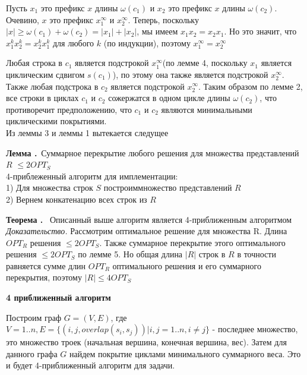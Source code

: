 \documentclass[11pt,a4paper]{article}
\newcommand\ifnonempty[2]{\ifthenelse{\equal{#1}{}}{}{#2}}
\newcounter{thm}
\newcounter{lem}
\newcommand{\thm}[1][]{\smallskip\par\hangafter=1\normalsize\textbf{Теорема \refstepcounter{thm}\thethm\ifnonempty{#1}{ (#1)}.}~}
\newcommand{\lem}[1][]{\smallskip\par\hangafter=1\normalsize\textbf{Лемма \refstepcounter{lem}\thelem\ifnonempty{#1}{ (#1)}.}~}
\begin{document}
Пусть $x_1$ это префикс $x$ длины $\omega(c_1)$ и $x_2$ это префикс $x$ длины $\omega(c_2)$. Очевино, $x$ это префикс $x_1^\infty$ и $x_2^\infty.$
Теперь, поскольку $|x| \ge \omega(c_1) + \omega(c_2) = |x_1| + |x_2|$, мы имеем $x_1 x_2 = x_2 x_1$. Но это значит, что $x_1^k x_2^k = x_2^k x_1^k$
для любого $k$ (по индукции), поэтому $x_1^\infty = x_2^\infty$
\par
Любая строка в $c_1$ является подстрокой $x_1^\infty$(по лемме 4, поскольку $x_1$ является циклическим сдвигом $s(c_1)$), по этому она также является
подстрокой $x_2^\infty$. Также любая подстрока в $c_2$ является подстрокой $x_2^\infty$. Таким образом по лемме 2, все строки в циклах $c_1$ и $c_2$
сожержатся в одном цикле длины $\omega(c_2)$, что противоречит предположению, что $c_1$ и $c_2$ являются минимальными циклическими покрытиями.
\\
Из леммы 3 и леммы 1 вытекается следущее

\lem Суммарное перекрытие любого решения для множества представлений $R$ $\le 2OPT_S$\\

4-приблеженный алгоритм для имплементации:\\
1) Для множества строк $S$ построиммножество представлений $R$\\
2) Вернем конкатенацию всех строк из $R$\\
\thm
Описанный выше алгоритм является 4-приближенным алгоритмом \\
\textit{Доказательство.} Рассмотрим оптимальное решение для множества R. Длина $OPT_R$ решения $\le 2OPT_S$.
Также суммарное перекрытие этого оптимального решения $\le 2OPT_S$ по лемме 5. Но общая длина $|R|$ строк в $R$
в точности равняется сумме длин $OPT_R$ оптимального решения и его суммарного перекрытия, поэтому $|R| \le 4OPT_S$
\\
\begin{center}
\Large
\textbf{4 приближенный алгоритм}
\normalsize
\end{center}
\par

Построим граф $G = (V, E)$, где $V = 1..n, E = \{(i, j, overlap(s_i, s_j))| i, j = 1..n, i \ne j\}$ - последнее множество,
это множество троек (начальная вершина, конечная вершина, вес). Затем для данного графа $G$ найдем покрытие циклами минимального суммарного веса.
Это и будет 4-приближенный алгоритм для задачи.
\end{document}
